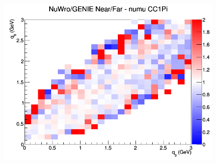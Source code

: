 \begin{figure}[h]
\endminipage
{}
\includegraphics[width=\linewidth]{eff_q0_q3/LAr/ratios/CC1Pi_NuWro_GENIE_numu_NF_q3_q0.png}
\endminipage
\newline
\end{figure}
\clearpage
